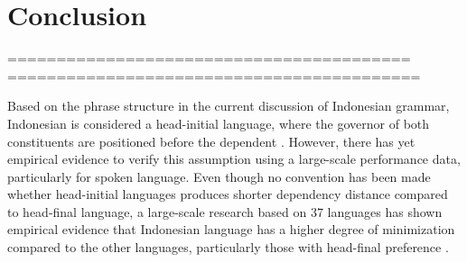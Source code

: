 \documentclass[10pt, a4paper, conference, compsocconf]{IEEEtran}
\begin{document}
%





\section{Conclusion}

=========================================
==========================================

Based on the phrase structure in the current discussion of Indonesian grammar, Indonesian is considered a head-initial language, where the governor of both constituents are positioned before the dependent \cite{kridalaksana2002struktur, sneddon2010indonesian}. However, there has yet empirical evidence to verify this assumption using a large-scale performance data, particularly for spoken language. Even though no convention has been made whether head-initial languages produces shorter dependency distance compared to head-final language, a large-scale research based on 37 languages has shown empirical evidence that Indonesian language has a higher degree of minimization compared to the other languages, particularly those with head-final preference \cite{futrell2015large}. 
\end{document}
